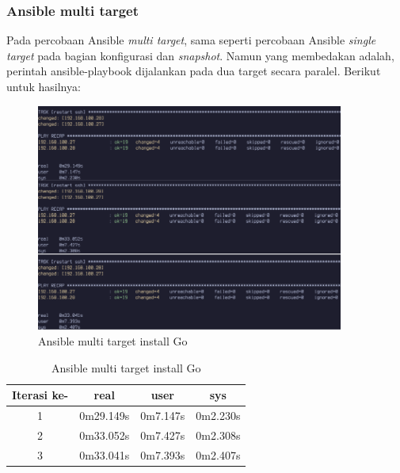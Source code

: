 \documentclass[10pt,twoside]{report}
\begin{document}
\begin{adjustwidth}{20pt}{}
	\subsubsection{Ansible multi target}
	\begin{adjustwidth}{20pt}{}
		Pada percobaan Ansible \textit{multi target}, sama seperti percobaan Ansible \textit{single target}
		pada bagian konfigurasi dan \textit{snapshot}. Namun yang membedakan adalah, perintah
		ansible-playbook dijalankan pada dua target secara paralel. Berikut untuk hasilnya:
	\end{adjustwidth}
	\begin{figure}[h]
		\begin{center}
			\includegraphics[width=0.9\textwidth]{images/ansible/multi/ansible-go-multi-com.png}
		\end{center}
		\caption{Ansible multi target install Go}
	\end{figure}

	\begin{table}[h]
		\caption{Ansible multi target install Go}
		\begin{center}
			\begin{tabular}[c]{|c|c|c|c|}
				\hline
				\multicolumn{1}{|c|}{\textbf{Iterasi ke-}} &
				\multicolumn{1}{c|}{\textbf{real}}         &
				\multicolumn{1}{c|}{\textbf{user}}         &
				\multicolumn{1}{c|}{\textbf{sys}}                                            \\
				\hline
				1                                          & 0m29.149s & 0m7.147s & 0m2.230s \\
				\hline
				2                                          & 0m33.052s & 0m7.427s & 0m2.308s \\
				\hline
				3                                          & 0m33.041s & 0m7.393s & 0m2.407s \\
				\hline
			\end{tabular}
		\end{center}
	\end{table}

\end{adjustwidth}
\end{document}
